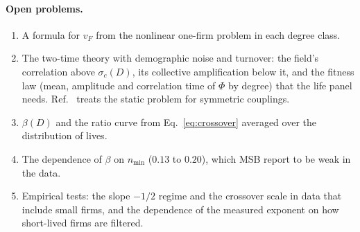 \documentclass[pre,twocolumn,superscriptaddress,nofootinbib]{revtex4-2}
\begin{document}
\paragraph{Open problems.}
\begin{enumerate}
\item A formula for $v_F$ from the nonlinear one-firm problem in each degree class.
\item The two-time theory with demographic noise and turnover: the field's correlation above
  $\sigma_c(D)$, its collective amplification below it, and the fitness law (mean, amplitude and
  correlation time of $\Phi$ by degree) that the life panel needs.  Ref.~\cite{altieri2021} treats the
  static problem for symmetric couplings.
\item $\beta(D)$ and the ratio curve from Eq.~\eqref{eq:crossover} averaged over the distribution of lives.
\item The dependence of $\beta$ on $n_{\min}$ ($0.13$ to $0.20$), which MSB report to be weak in the data.
\item Empirical tests: the slope $-1/2$ regime and the crossover scale in data that include small
  firms, and the dependence of the measured exponent on how short-lived firms are filtered.
\end{enumerate}


\end{document}
